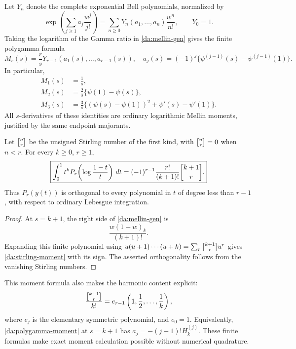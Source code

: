 Let \(Y_n\) denote the complete exponential Bell polynomials, normalized by
\[
 \exp\left(\sum_{j\ge1}a_j\frac{w^j}{j!}\right)
      =\sum_{n\ge0}Y_n(a_1,\ldots,a_n)\frac{w^n}{n!},
 \qquad Y_0=1.
\]
Taking the logarithm of the Gamma ratio in \eqref{da:mellin-gen} gives
the finite polygamma formula
\begin{equation}\label{da:polygamma-moment}
 M_r(s)=\frac r{s}Y_{r-1}(a_1(s),\ldots,a_{r-1}(s)),
 \quad
 a_j(s)=(-1)^j\{\psi^{(j-1)}(s)-\psi^{(j-1)}(1)\}.
\end{equation}
In particular,
\begin{align*}
 M_1(s)&=\frac1s,\\
 M_2(s)&=\frac2s\{\psi(1)-\psi(s)\},\\
 M_3(s)&=\frac3s\bigl\{(\psi(s)-\psi(1))^2+
                                   \psi'(s)-\psi'(1)\bigr\}.
\end{align*}
All \(s\)-derivatives of these identities are ordinary logarithmic Mellin
moments, justified by the same endpoint majorants.

\begin{corollary}
\label{da:stirling}
Let \(\stir nr\) be the unsigned Stirling number of the first kind, with
\(\stir nr=0\) when \(n<r\). For every \(k\ge0\), \(r\ge1\),
\begin{equation}\label{da:stirling-moment}
 \boxed{\displaystyle
  \int_0^1 t^kP_r\!\left(\log\frac{1-t}{t}\right)\dd t
    =(-1)^{r-1}\frac{r!}{(k+1)!}\stir{k+1}{r}.}
\end{equation}
Thus \(P_r(y(t))\) is orthogonal to every polynomial in \(t\) of degree
less than \(r-1\), with respect to ordinary Lebesgue integration.
\end{corollary}

\begin{proof}
At \(s=k+1\), the right side of \eqref{da:mellin-gen} is
\[
 \frac{w(1-w)_k}{(k+1)!}.
\]
Expanding this finite polynomial using
\(u(u+1)\cdots(u+k)=\sum_r\stir{k+1}{r}u^r\)
gives \eqref{da:stirling-moment} with its sign. The asserted
orthogonality follows from the vanishing Stirling numbers.
\end{proof}

This moment formula also makes the harmonic content explicit:
\[
 \frac{\stir{k+1}{r}}{k!}
 =e_{r-1}\left(1,\frac12,\ldots,\frac1k\right),
\]
where \(e_j\) is the elementary symmetric polynomial, and \(e_0=1\).
Equivalently, \eqref{da:polygamma-moment} at \(s=k+1\) has
\(a_j=-(j-1)!H_k^{(j)}\). These finite formulas make exact moment
calculation possible without numerical quadrature.

